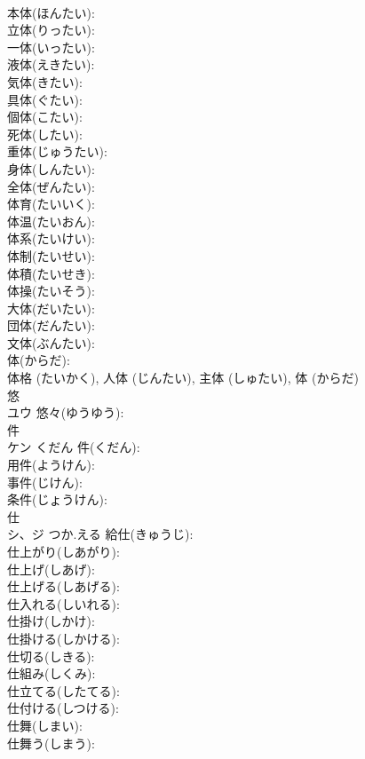 \documentclass[8pt]{extreport}
\begin{document}
\begin{CJK}{UTF8}{min}
\\	本体(ほんたい): 
\\	立体(りったい): 
\\	一体(いったい): 
\\	液体(えきたい): 
\\	気体(きたい): 
\\	具体(ぐたい): 
\\	個体(こたい): 
\\	死体(したい): 
\\	重体(じゅうたい): 
\\	身体(しんたい): 
\\	全体(ぜんたい): 
\\	体育(たいいく): 
\\	体温(たいおん): 
\\	体系(たいけい): 
\\	体制(たいせい): 
\\	体積(たいせき): 
\\	体操(たいそう): 
\\	大体(だいたい): 
\\	団体(だんたい): 
\\	文体(ぶんたい): 
\\	体(からだ): 
\\	体格 (たいかく), 人体 (じんたい), 主体 (しゅたい), 体 (からだ)
\\	悠			
\\	ユウ		悠々(ゆうゆう): 
\\	件			
\\	ケン	くだん	件(くだん): 
\\	用件(ようけん): 
\\	事件(じけん): 
\\	条件(じょうけん): 
\\	仕			
\\	シ、ジ	つか.える	給仕(きゅうじ): 
\\	仕上がり(しあがり): 
\\	仕上げ(しあげ): 
\\	仕上げる(しあげる): 
\\	仕入れる(しいれる): 
\\	仕掛け(しかけ): 
\\	仕掛ける(しかける): 
\\	仕切る(しきる): 
\\	仕組み(しくみ): 
\\	仕立てる(したてる): 
\\	仕付ける(しつける): 
\\	仕舞(しまい): 
\\	仕舞う(しまう): 

\end{CJK}
\end{document}
